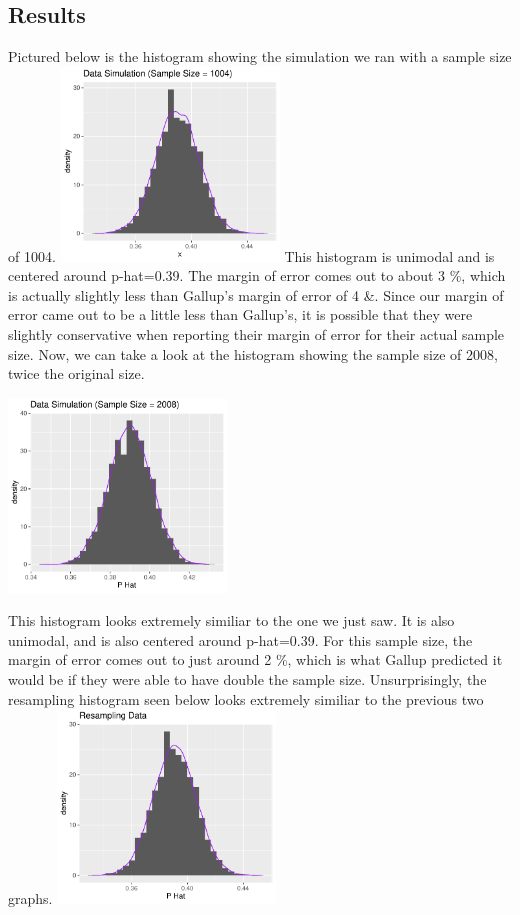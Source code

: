 \documentclass{article}\usepackage[]{graphicx}\usepackage[]{xcolor}
\begin{document}
\begin{multicols}{2}
\section{Results}
Pictured below is the histogram showing the simulation we ran with a sample size of 1004.
\includegraphics[width=0.435\textwidth]{1004Simulation.pdf}
\indent 
This histogram is unimodal and is centered around p-hat=0.39. The margin of error comes out to about 3 \%, which is actually slightly less than Gallup's margin of error of 4 \&. Since our margin of error came out to be a little less than Gallup's, it is possible that they were slightly conservative when reporting their margin of error for their actual sample size.
\newline
\indent 
Now, we can take a look at the histogram showing the sample size of 2008, twice the original size.
\begin{center}
  \includegraphics[width=0.435\textwidth]{2008sample.pdf}
\end{center}
\indent 
This histogram looks extremely similiar to the one we just saw. It is also unimodal, and is also centered around p-hat=0.39. For this sample size, the margin of error comes out to just around 2 \%, which is what Gallup predicted it would be if they were able to have double the sample size.
\newline
\indent
Unsurprisingly, the resampling histogram seen below looks extremely similiar to the previous two graphs.
\includegraphics[width=0.435\textwidth]{resampling.pdf}

\end{multicols}
\end{document}
